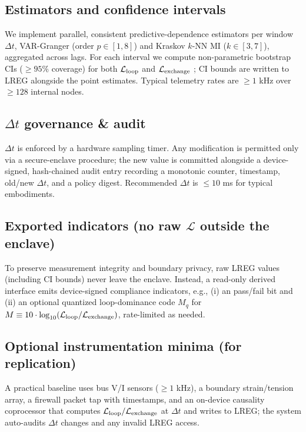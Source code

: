 \documentclass[11pt]{article}
\begin{document}
\subsection{Estimators and confidence intervals}

We implement parallel, consistent predictive-dependence estimators per window $\Delta t$, VAR-Granger (order $p \in [1,8]$) and Kraskov $k$-NN MI ($k \in [3,7]$), aggregated across lags. For each interval we compute non-parametric bootstrap CIs ($\geq 95\%$ coverage) for both $\mathcal{L}_{\text{loop}}$ and $\mathcal{L}_{\text{exchange}}$ \cite{efron1979bootstrap}; CI bounds are written to LREG alongside the point estimates. Typical telemetry rates are $\geq 1$ kHz over $\geq 128$ internal nodes.

\subsection{$\Delta t$ governance \& audit}

$\Delta t$ is enforced by a hardware sampling timer. Any modification is permitted only via a secure-enclave procedure; the new value is committed alongside a device-signed, hash-chained audit entry recording a monotonic counter, timestamp, old/new $\Delta t$, and a policy digest. Recommended $\Delta t$ is $\leq 10$ ms for typical embodiments.

\subsection{Exported indicators (no raw $\mathcal{L}$ outside the enclave)}

To preserve measurement integrity and boundary privacy, raw LREG values (including CI bounds) never leave the enclave. Instead, a read-only derived interface emits device-signed compliance indicators, e.g., (i) an \NC pass/fail bit and (ii) an optional quantized loop-dominance code $M_q$ for $M \equiv 10 \cdot \log_{10}(\mathcal{L}_{\text{loop}}/\mathcal{L}_{\text{exchange}})$, rate-limited as needed.

\subsection{Optional instrumentation minima (for replication)}

A practical baseline uses bus V/I sensors ($\geq 1$ kHz), a boundary strain/tension array, a firewall packet tap with timestamps, and an on-device causality coprocessor that computes $\mathcal{L}_{\text{loop}}/\mathcal{L}_{\text{exchange}}$ at $\Delta t$ and writes to LREG; the system auto-audits $\Delta t$ changes and any invalid LREG access.
\end{document}

